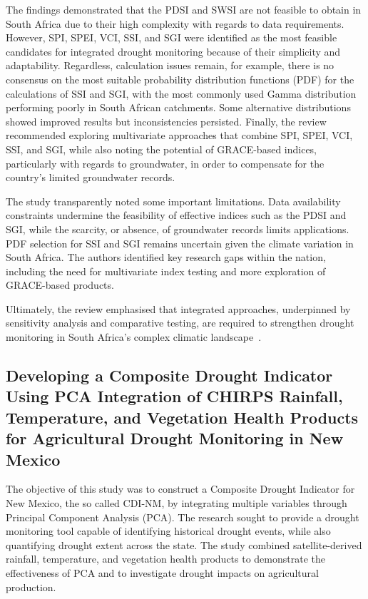The findings demonstrated that the PDSI and SWSI are not feasible to obtain in South Africa due to their high complexity with regards to data requirements. However, SPI, SPEI, VCI, SSI, and SGI were identified as the most feasible candidates for integrated drought monitoring because of their simplicity and adaptability. Regardless, calculation issues remain, for example, there is no consensus on the most suitable probability distribution functions (PDF) for the calculations of SSI and SGI, with the most commonly used Gamma distribution performing poorly in South African catchments. Some alternative distributions showed improved results but inconsistencies persisted. Finally, the review recommended exploring multivariate approaches that combine SPI, SPEI, VCI, SSI, and SGI, while also noting the potential of GRACE-based indices, particularly with regards to groundwater, in order to compensate for the country’s limited groundwater records. 

The study transparently noted some important limitations. Data availability constraints undermine the feasibility of effective indices such as the PDSI and SGI, while the scarcity, or absence, of groundwater records limits applications. PDF selection for SSI and SGI remains uncertain given the climate variation in South Africa. The authors identified key research gaps within the nation, including the need for multivariate index testing and more exploration of GRACE-based products.

Ultimately, the review emphasised that integrated approaches, underpinned by sensitivity analysis and comparative testing, are required to strengthen drought monitoring in South Africa’s complex climatic landscape~\cite{za_drought_review}.

\subsection*{Developing a Composite Drought Indicator Using PCA Integration of CHIRPS Rainfall, Temperature, and Vegetation Health Products for Agricultural Drought Monitoring in New Mexico}

The objective of this study was to construct a Composite Drought Indicator for New Mexico, the so called CDI-NM, by integrating multiple variables through Principal Component Analysis (PCA). The research sought to provide a drought monitoring tool capable of identifying historical drought events, while also quantifying drought extent across the state. The study combined satellite-derived rainfall, temperature, and vegetation health products to demonstrate the effectiveness of PCA and to investigate drought impacts on agricultural production. 

